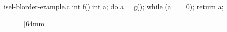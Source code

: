 \begin{filecontents*}{isel-blorder-example.c}
int f() {
  int a;
  do {
    a = g();
  } while (a == 0);
  return a;
}
\end{filecontents*}

\begin{figure}
  \centering%
                {}%
  \hspace{5mm}%
                [64mm]%
                {}%

  \vspace{\betweensubfigures}


\end{figure}
